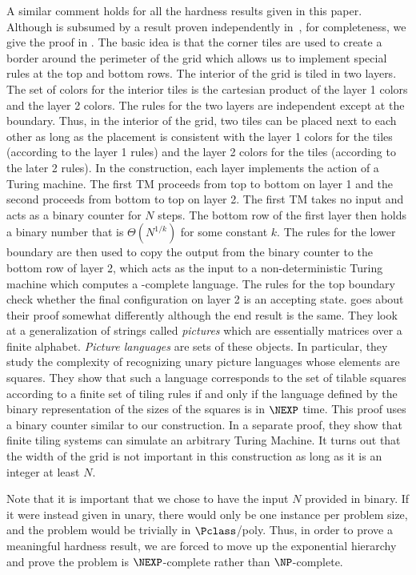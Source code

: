 A similar comment holds for all the hardness results given in this paper.
Although  is subsumed by a result proven
independently in~\cite{BGL09}, for completeness,
we give the proof in . The basic idea is that the
corner tiles are used to create a border around the perimeter of the grid which
allows us to implement special rules at the top and bottom rows.
The interior of the grid is tiled in two layers.
The set of colors for the interior tiles is the cartesian product of the
layer 1 colors and the layer 2 colors.
The rules for the two layers are independent except at the boundary.
Thus, in the interior of the grid, two tiles can be placed next to each
other as long as the placement is consistent with  the layer 1 colors for
the tiles (according to the layer 1 rules) and the layer 2 colors for the tiles
(according to the later 2 rules).
In the construction, each layer implements
the action of a Turing machine.
The first TM proceeds from top to bottom
on layer 1 and the second proceeds from bottom to top on layer 2.
The first TM takes no input and acts
as a binary counter for $N$ steps. The bottom row
of  the first layer then
holds a binary number that is $\Theta(N^{1/k})$ for some constant $k$.
The rules for the lower boundary are then used
to copy the output from the binary counter to the bottom row of layer 2, which
acts as the input to a non-deterministic Turing machine which computes a \NEXP-complete
language.
The rules for the top boundary check whether
the final configuration on layer 2 is an accepting  state.
\cite{BGL09} goes about their proof somewhat differently although the end result is the
same. They look at a generalization of strings called \emph{pictures} which are essentially matrices
over a finite alphabet. \emph{Picture languages} are sets of these objects.
In particular, they study the complexity of recognizing unary picture languages
whose elements are squares.
They show that such a language corresponds to the set of tilable squares according to a finite
set of tiling rules if and only if the language defined by the binary representation
of the sizes of the squares is in $\NEXP$ time. This proof uses a binary counter similar to our
construction. In a separate proof, they show that finite tiling systems can
simulate an arbitrary Turing Machine.
It turns out that the width of the grid is not important in this
construction as long as it is an integer
at least $N$.

Note that it is important that we chose to have the input $N$ provided in binary.
If it were instead given in unary, there would only be one instance per problem size,
and the problem would be trivially in $\Pclass$/poly.  Thus, in order to prove
a meaningful hardness result, we are forced to move up the exponential hierarchy
and prove the problem is $\NEXP$-complete rather than $\NP$-complete.

